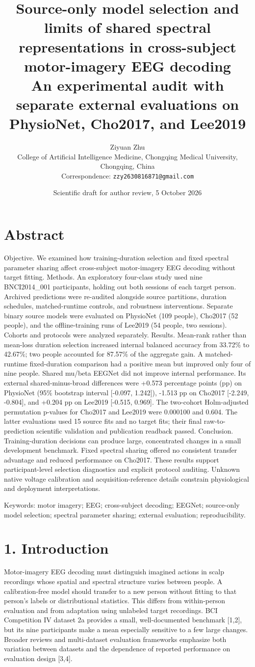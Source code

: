 \documentclass[11pt]{article}
\title{Source-only model selection and limits of shared spectral representations in cross-subject motor-imagery EEG decoding\\\large An experimental audit with separate external evaluations on PhysioNet, Cho2017, and Lee2019}
\author{Ziyuan Zhu\\\small College of Artificial Intelligence Medicine, Chongqing Medical University, Chongqing, China\\\small Correspondence: \texttt{zzy2630816871@gmail.com}}
\date{Scientific draft for author review, 5 October 2026}
\begin{document}
\maketitle
\section*{Abstract}
Objective. We examined how training-duration selection and fixed spectral parameter sharing affect cross-subject motor-imagery EEG decoding without target fitting. Methods. An exploratory four-class study used nine BNCI2014\_001 participants, holding out both sessions of each target person. Archived predictions were re-audited alongside source partitions, duration schedules, matched-runtime controls, and robustness interventions. Separate binary source models were evaluated on PhysioNet (109 people), Cho2017 (52 people), and the offline-training runs of Lee2019 (54 people, two sessions). Cohorts and protocols were analyzed separately. Results. Mean-rank rather than mean-loss duration selection increased internal balanced accuracy from 33.72\% to 42.67\%; two people accounted for 87.57\% of the aggregate gain. A matched-runtime fixed-duration comparison had a positive mean but improved only four of nine people. Shared mu/beta EEGNet did not improve internal performance. Its external shared-minus-broad differences were +0.573 percentage points (pp) on PhysioNet (95\% bootstrap interval [-0.097, 1.242]), -1.513 pp on Cho2017 [-2.249, -0.804], and +0.204 pp on Lee2019 [-0.515, 0.969]. The two-cohort Holm-adjusted permutation p-values for Cho2017 and Lee2019 were 0.000100 and 0.604. The latter evaluations used 15 source fits and no target fits; their final raw-to-prediction scientific validation and publication readback passed. Conclusion. Training-duration decisions can produce large, concentrated changes in a small development benchmark. Fixed spectral sharing offered no consistent transfer advantage and reduced performance on Cho2017. These results support participant-level selection diagnostics and explicit protocol auditing. Unknown native voltage calibration and acquisition-reference details constrain physiological and deployment interpretations.

Keywords: motor imagery; EEG; cross-subject decoding; EEGNet; source-only model selection; spectral parameter sharing; external evaluation; reproducibility.

\section*{1. Introduction}
Motor-imagery EEG decoding must distinguish imagined actions in scalp recordings whose spatial and spectral structure varies between people. A calibration-free model should transfer to a new person without fitting to that person's labels or distributional statistics. This differs from within-person evaluation and from adaptation using unlabeled target recordings. BCI Competition IV dataset 2a provides a small, well-documented benchmark [1,2], but its nine participants make a mean especially sensitive to a few large changes. Broader reviews and multi-dataset evaluation frameworks emphasize both variation between datasets and the dependence of reported performance on evaluation design [3,4].
\end{document}

